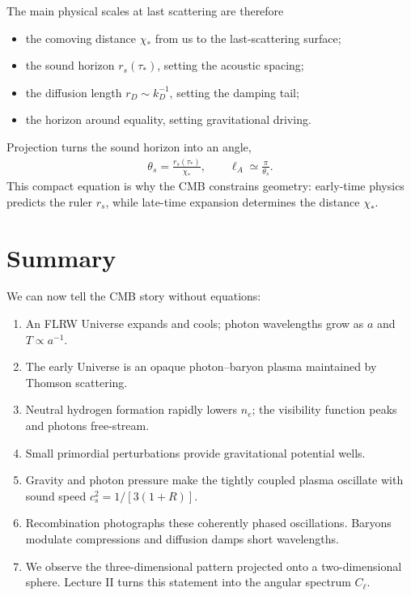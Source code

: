 \documentclass[12pt]{article}
\newcommand{\be}{\begin{eqnarray}}
\newcommand{\ee}{\end{eqnarray}}
\begin{document}
The main physical scales at last scattering are therefore
\begin{itemize}
\item the comoving distance $\chi_*$ from us to the last-scattering surface;
\item the sound horizon $r_s(\tau_*)$, setting the acoustic spacing;
\item the diffusion length $r_D\sim k_D^{-1}$, setting the damping tail;
\item the horizon around equality, setting gravitational driving.
\end{itemize}
Projection turns the sound horizon into an angle,
\be
\boxed{\theta_s=\frac{r_s(\tau_*)}{\chi_*},
\qquad \ell_A\simeq\frac{\pi}{\theta_s}.}
\ee
This compact equation is why the CMB constrains geometry: early-time physics predicts
the ruler $r_s$, while late-time expansion determines the distance $\chi_*$.

\section*{Summary}
We can now tell the CMB story without equations:
\begin{enumerate}
\item An FLRW Universe expands and cools; photon wavelengths grow as $a$ and $T\propto a^{-1}$.
\item The early Universe is an opaque photon--baryon plasma maintained by Thomson scattering.
\item Neutral hydrogen formation rapidly lowers $n_e$; the visibility function peaks and photons free-stream.
\item Small primordial perturbations provide gravitational potential wells.
\item Gravity and photon pressure make the tightly coupled plasma oscillate with sound speed
$c_s^2=1/[3(1+R)]$.
\item Recombination photographs these coherently phased oscillations. Baryons modulate
compressions and diffusion damps short wavelengths.
\item We observe the three-dimensional pattern projected onto a two-dimensional sphere.
Lecture II turns this statement into the angular spectrum $C_\ell$.
\end{enumerate}
\end{document}
